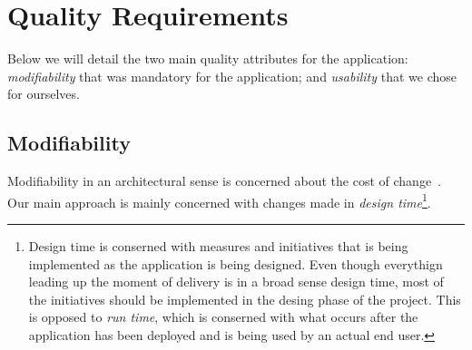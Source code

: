 \chapter{Quality Requirements}
Below we will detail the two main quality attributes for the application: \emph{modifiability} that was mandatory for the application; and \emph{usability} that we chose for ourselves. 


\section{Modifiability}
Modifiability in an architectural sense is concerned about the cost of change \cite{pensum}. Our main approach is mainly concerned with changes made in \emph{design time}\footnote{Design time is conserned with measures and initiatives that is being implemented as the application is being designed. Even though everythign leading up the moment of delivery is in a broad sense design time, most of the initiatives should be implemented in the desing phase of the project. This is opposed to \emph{run time}, which is conserned with what occurs after the application has been deployed and is being used by an actual end user.}.


